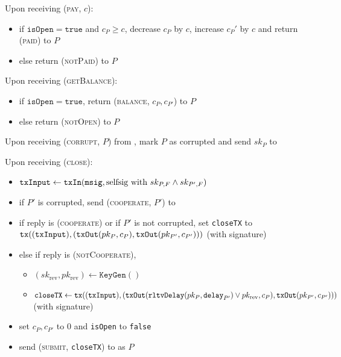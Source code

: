 \begin{systembox}{\fch}
  Upon receiving (\textsc{pay}, $c$):
  \begin{itemize}
    \item if $\mathtt{isOpen} = \mathtt{true}$ and $c_P \geq c$, decrease
    $c_P$ by $c$, increase $c_P'$ by $c$ and return (\textsc{paid}) to $P$
    \item else return (\textsc{notPaid}) to $P$
  \end{itemize}

  Upon receiving (\textsc{getBalance}):
  \begin{itemize}
    \item if $\mathtt{isOpen} = \mathtt{true}$, return (\textsc{balance},
    $c_P, c_{P'}$) to $P$
    \item else return (\textsc{notOpen}) to $P$
  \end{itemize}

  Upon receiving (\textsc{corrupt}, $P$) from \adversary, mark $P$ as corrupted
  and send $sk_P$ to \adversary

  Upon receiving (\textsc{close}):
  \begin{itemize}
    \item $\mathtt{txInput} \gets \mathtt{txIn}(\mathtt{msig}, \text{selfsig with }
    sk_{P, F} \wedge sk_{P', F})$
    \item if $P'$ is corrupted, send (\textsc{cooperate}, $P'$) to \adversary
    \item if reply is (\textsc{cooperate}) or if $P'$ is not corrupted, set
    \texttt{closeTX} to $\texttt{tx}((\mathtt{txInput}), (\mathtt{txOut}(pk_P, c_P),
    \mathtt{txOut}(pk_{P'}, c_{P'})))$ (with signature)
    \item else if reply is (\textsc{notCooperate}),
    \begin{itemize}
      \item $(sk_{\mathrm{rev}}, pk_{\mathrm{rev}}) \gets \mathtt{KeyGen}()$
      \item $\mathtt{closeTX} \gets \texttt{tx}((\mathtt{txInput}), (\mathtt{txOut}(\mathtt{rltvDelay}(pk_P,
      \mathtt{delay}_{P'}) \vee pk_{\mathrm{rev}}, c_P), \mathtt{txOut}(pk_{P'},
      c_{P'})))$ (with signature)
    \end{itemize}
    \item set $c_P, c_{P'}$ to 0 and \texttt{isOpen} to \texttt{false}
    \item send (\textsc{submit}, \texttt{closeTX}) to \ledger{} as $P$
  \end{itemize}
\end{systembox}
